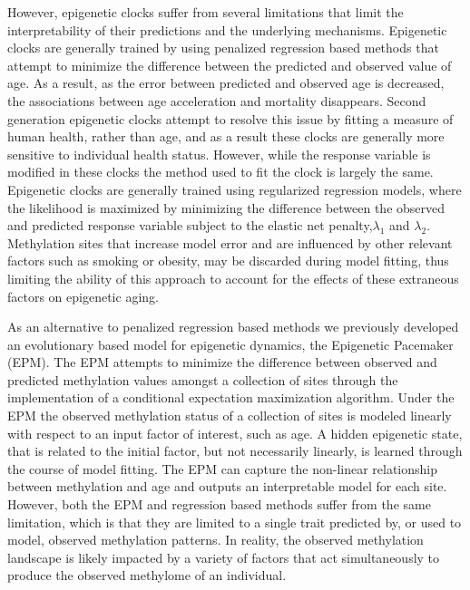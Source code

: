 \documentclass[sn-nature]{sn-jnl}
\begin{document}
{\begin{linenumbers}
However, epigenetic clocks suffer from several limitations that limit the interpretability of their 
predictions and the underlying mechanisms. Epigenetic clocks are generally trained by using penalized regression based 
methods that attempt to minimize the difference between the predicted and observed value of  age. As a result, as the 
error between predicted and observed age is decreased, the associations between age acceleration and mortality 
disappears\cite{Zhang2019-br}. Second generation epigenetic clocks attempt to resolve this issue by fitting a 
measure of human health, rather than age, and as a result these clocks are generally more sensitive to individual 
health status\cite{Lu2019-lg,Levine2018-en,Belsky2020-ha}. However, while the response variable
is modified in these clocks the method used to fit the clock is largely the same. Epigenetic clocks are generally 
trained using regularized regression models, where the likelihood is maximized by minimizing the difference between 
the observed and predicted response variable subject to the elastic net penalty,$\lambda_1$ and $\lambda_2$. Methylation 
sites that increase model error and are influenced by other relevant factors such as smoking or obesity, may be 
discarded during model fitting, thus limiting the ability of this approach to account for the effects of these 
extraneous factors on epigenetic aging. 

As an alternative to penalized regression based methods we previously developed an evolutionary based model for 
epigenetic dynamics, the Epigenetic Pacemaker (EPM)\cite{Farrell2020-bn,Snir2016-dv}. The EPM 
attempts to minimize the difference between observed and predicted methylation values amongst a collection of 
sites through the implementation of a conditional expectation maximization algorithm\cite{Snir2020-tc}. Under the EPM 
the observed methylation status of a collection of sites is modeled linearly with respect to an input factor of
 interest, such as age. A hidden epigenetic state, that is related to the initial factor, but not necessarily 
 linearly, is learned through the course of model fitting. The EPM can capture the non-linear relationship 
 between methylation and age\cite{Snir2019-ii} and outputs an interpretable model for each site. However,
  both the EPM and regression based methods suffer from the same limitation, which is that they are limited
  to a single trait predicted by, or used to model, observed methylation patterns. In reality, the observed 
  methylation landscape is likely impacted by a variety of factors that act simultaneously to produce the 
  observed methylome of an individual. 


\end{linenumbers}}
\end{document}
